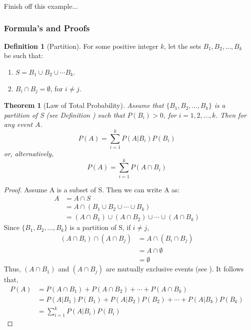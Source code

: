 \documentclass{article}
\theoremstyle{plain}
\newtheorem{thm}{Theorem}[section]
\theoremstyle{definition}
\newtheorem{defn}{Definition}[section]
\theoremstyle{remark}
\begin{document}
Finish off this example...

\subsubsection{Formula's and Proofs}
\begin{defn}[Partition] 
For some positive integer $k$, let the sets $B_1,B_2,\ldots,B_k$ be such that:
\begin{enumerate}
\item $S = B_1 \cup B_2 \cup \cdots B_k$.
\item $B_i \cap B_j = \emptyset$, for $i \not = j$.
\end{enumerate}
\end{defn}

\begin{thm}[Law of Total Probability] 
  Assume that $\{B_1, B_2, \ldots, B_k\}$ is a partition of S (see Definition ) such that $P(B_i) > 0$, for $i = 1, 2, \ldots,k$. Then for any event $A$.
  $$
  P(A) = \displaystyle \sum_{i=1}^k P(A|B_i) P(B_i)
  $$
  or, alternatively,
  $$
  P(A) = \displaystyle \sum_{i=1}^k P(A \cap B_i)
  $$
\end{thm}
\begin{proof}
  Assume A is a subset of S. Then we can write A as:
  \begin{align*}
    A &= A \cap S\\
      &= A \cap (B_1 \cup B_2 \cup \cdots \cup B_k)\\
      &= (A \cap B_1) \cup (A \cap B_2) \cup \cdots \cup (A \cap B_k)
  \end{align*}
  Since $\{B_1, B_2, \ldots, B_k\}$ is a partition of S, if $i \not = j$,
  \begin{align*}
    (A \cap B_i) \cap (A \cap B_j) &= A \cap (B_i \cap B_j)\\
    &= A \cap \emptyset\\
    &= \emptyset
  \end{align*}
  Thus, $(A \cap B_1)$ and $(A \cap B_j)$ are mutually exclusive events (see ). It follows that,
  \begin{align*}
    P(A) &= P(A \cap B_1) + P(A \cap B_2) + \cdots + P(A \cap B_k)\\
    &= P(A|B_1)P(B_1) + P(A|B_2)P(B_2) + \cdots + P(A|B_k)P(B_k)\\
    &= \displaystyle \sum_{i=1}^k P(A|B_i)P(B_i)
  \end{align*}
\end{proof}
\end{document}
